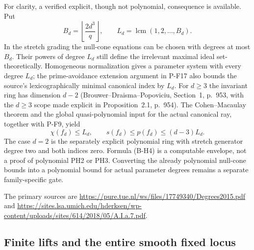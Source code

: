 \documentclass[11pt,a4paper]{article}
\begin{document}
For clarity, a verified explicit, though not polynomial, consequence
is available. Put
\[
 B_d=\left\lfloor\frac{2d^3}{q}\right\rfloor,
 \qquad L_d=\operatorname{lcm}(1,2,\ldots,B_d).
\]
In the stretch grading the null-cone equations can be chosen with
degrees at most $B_d$. Their powers of degree $L_d$ still define
the irrelevant maximal ideal set-theoretically. Homogeneous
normalization gives a parameter system with every degree $L_d$;
the prime-avoidance extension argument in P-F17 also bounds the
source's lexicographically minimal canonical index by $L_d$.
For $d\ge3$ the invariant ring has dimension $d-2$
(Brouwer--Draisma--Popoviciu, Section~1, p.~953, with the
$d\ge3$ scope made explicit in Proposition~2.1, p.~954).
The Cohen--Macaulay theorem and the global quasi-polynomial
input for the actual canonical ray, together with P-F9, yield
\[
 \chi(f_d)\le L_d,\qquad
 s(f_d)\le p(f_d)\le(d-3)L_d.
 \tag{B-H4}
\]
The case $d=2$ is the separately explicit polynomial ring with
stretch generator degree two and both indices zero. Formula
(B-H4) is a computable envelope, not a proof of polynomial PH2 or
PH3. Converting the already polynomial null-cone bounds into a
polynomial bound for actual parameter degrees remains a separate
family-specific gate.

The primary sources are
\url{https://pure.tue.nl/ws/files/17749340/Degrees2015.pdf}
and
\url{https://sites.lsa.umich.edu/hderksen/wp-content/uploads/sites/614/2018/05/A.I.a.7.pdf}.


\subsection{Finite lifts and the entire smooth fixed locus}
\end{document}
